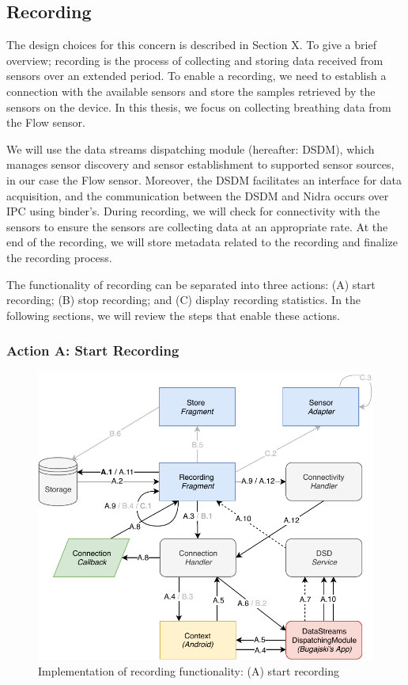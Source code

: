 \subsection{Recording}
The design choices for this concern is described in Section X. To give a brief overview; recording is the process of collecting and storing data received from sensors over an extended period. To enable a recording, we need to establish a connection with the available sensors and store the samples retrieved by the sensors on the device. In this thesis, we focus on collecting breathing data from the Flow sensor. 

We will use the data streams dispatching module (hereafter: DSDM), which manages sensor discovery and sensor establishment to supported sensor sources, in our case the Flow sensor.  Moreover, the DSDM facilitates an interface for data acquisition, and the communication between the DSDM and Nidra occurs over IPC using binder's. During recording, we will check for connectivity with the sensors to ensure the sensors are collecting data at an appropriate rate. At the end of the recording, we will store metadata related to the recording and finalize the recording process. 

The functionality of recording can be separated into three actions: (A) start recording; (B) stop recording; and (C) display recording statistics. In the following sections, we will review the steps that enable these actions. 

\subsubsection{Action A: Start Recording}
\begin{figure}
    \centering
    \includegraphics[scale=0.7]{images/Recording_ImpA.pdf}
    \caption{Implementation of recording functionality: (A) start recording}
    \label{fig:impl_recordingA}
\end{figure}

